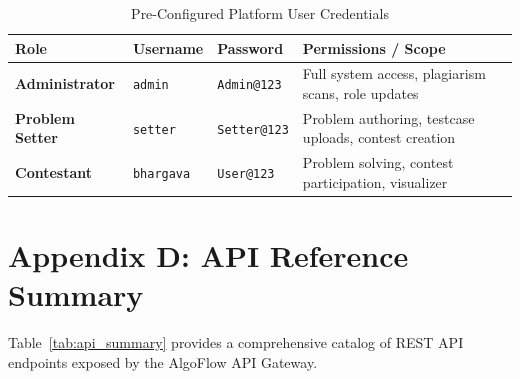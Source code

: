 \documentclass[12pt,a4paper]{report}
\begin{document}
\begin{table}[H]
\centering
\small
\setlength{\tabcolsep}{4pt}
\renewcommand{\arraystretch}{1.25}
\caption{Pre-Configured Platform User Credentials}
\label{tab:default_credentials}
\begin{tabularx}{\textwidth}{@{}l l l >{\raggedright\arraybackslash}X@{}}
\toprule
\textbf{Role} & \textbf{Username} & \textbf{Password} & \textbf{Permissions / Scope} \\ \midrule
\textbf{Administrator} & \texttt{admin} & \texttt{Admin@123} & Full system access, plagiarism scans, role updates \\
\textbf{Problem Setter} & \texttt{setter} & \texttt{Setter@123} & Problem authoring, testcase uploads, contest creation \\
\textbf{Contestant} & \texttt{bhargava} & \texttt{User@123} & Problem solving, contest participation, visualizer \\ \bottomrule
\end{tabularx}
\end{table}

\clearpage

\section*{Appendix D: API Reference Summary}
Table~\ref{tab:api_summary} provides a comprehensive catalog of REST API endpoints exposed by the AlgoFlow API Gateway.
\end{document}
